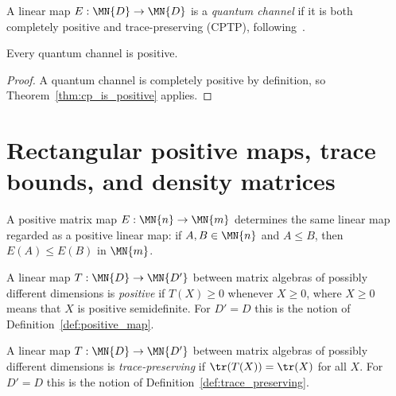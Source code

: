 \begin{definition}\label{def:channel}
    \leanok
    A linear map $E : \MN{D} \to \MN{D}$ is a \emph{quantum channel}
    if it is both completely positive and trace-preserving (CPTP),
    following~\cite{Wolf2012Quantum}.
\end{definition}

\begin{theorem}\label{thm:channel_positive}
    \leanok
    Every quantum channel is positive.
\end{theorem}

\begin{proof}\leanok{}
    A quantum channel is completely positive by definition, so
    Theorem~\ref{thm:cp_is_positive} applies.
\end{proof}

\section{Rectangular positive maps, trace bounds, and density matrices}

\begin{definition}
    \label{def:positive_map_is_positive_linear_map}
    \leanok
    A positive matrix map $E : \MN{n} \to \MN{m}$ determines the same
    linear map regarded as a positive linear map: if
    $A,B\in\MN{n}$ and $A \le B$, then $E(A) \le E(B)$ in $\MN{m}$.
\end{definition}

\begin{definition}
    \label{def:positive_map_rectangular}
    A linear map $T : \MN{D} \to \MN{D'}$ between matrix algebras of
    possibly different dimensions is \emph{positive} if $T(X) \ge 0$
    whenever $X \ge 0$, where $X \ge 0$ means that $X$ is positive
    semidefinite. For $D' = D$ this is the notion of
    Definition~\ref{def:positive_map}.
\end{definition}

\begin{definition}
    \label{def:trace_preserving_rectangular}
    A linear map $T : \MN{D} \to \MN{D'}$ between matrix algebras of
    possibly different dimensions is \emph{trace-preserving} if
    $\tr(T(X)) = \tr(X)$ for all $X$. For $D' = D$ this is the notion of
    Definition~\ref{def:trace_preserving}.
\end{definition}

